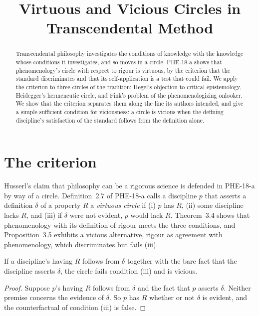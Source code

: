 \documentclass{situationist-preprint}
\title{Virtuous and Vicious Circles in Transcendental Method}
\begin{document}
\maketitle

\begin{abstract}
Transcendental philosophy investigates the conditions of knowledge with the knowledge whose conditions it investigates, and so moves in a circle. PHE-18-a shows that phenomenology's circle with respect to rigour is virtuous, by the criterion that the standard discriminates and that its self-application is a test that could fail. We apply the criterion to three circles of the tradition: Hegel's objection to critical epistemology, Heidegger's hermeneutic circle, and Fink's problem of the phenomenologizing onlooker. We show that the criterion separates them along the line its authors intended, and give a simple sufficient condition for viciousness: a circle is vicious when the defining discipline's satisfaction of the standard follows from the definition alone.
\end{abstract}

\section{The criterion}

Husserl's claim that philosophy can be a rigorous science \citep{Husserl1911} is defended in PHE-18-a by way of a circle. Definition~2.7 of PHE-18-a calls a discipline $p$ that asserts a definition $\delta$ of a property $R$ a \emph{virtuous circle} if (i) $p$ has $R$, (ii) some discipline lacks $R$, and (iii) if $\delta$ were not evident, $p$ would lack $R$. Theorem~3.4 shows that phenomenology with its definition of rigour meets the three conditions, and Proposition~3.5 exhibits a vicious alternative, rigour as agreement with phenomenology, which discriminates but fails (iii).

\begin{proposition}\label{p:suff}
If a discipline's having $R$ follows from $\delta$ together with the bare fact that the discipline asserts $\delta$, the circle fails condition (iii) and is vicious.
\end{proposition}

\begin{proof}
Suppose $p$'s having $R$ follows from $\delta$ and the fact that $p$ asserts $\delta$. Neither premise concerns the evidence of $\delta$. So $p$ has $R$ whether or not $\delta$ is evident, and the counterfactual of condition (iii) is false.
\end{proof}
\end{document}
